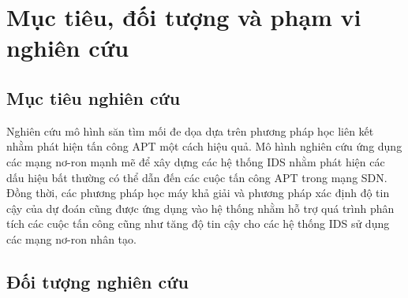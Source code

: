 





\section{Mục tiêu, đối tượng và phạm vi nghiên cứu}

\subsection{Mục tiêu nghiên cứu}

Nghiên cứu mô hình săn tìm mối đe dọa dựa trên phương pháp học liên kết nhằm phát hiện tấn công APT một cách hiệu quả. Mô hình nghiên cứu ứng dụng các mạng nơ-ron mạnh mẽ để xây dựng các hệ thống IDS nhằm phát hiện các dấu hiệu bất thường có thể dẫn đến các cuộc tấn công APT trong mạng SDN. Đồng thời, các phương pháp học máy khả giải và phương pháp xác định độ tin cậy của dự đoán cũng được ứng dụng vào hệ thống nhằm hỗ trợ quá trình phân tích các cuộc tấn công cũng như tăng độ tin cậy cho các hệ thống IDS sử dụng các mạng nơ-ron nhân tạo.

\subsection{Đối tượng nghiên cứu}


